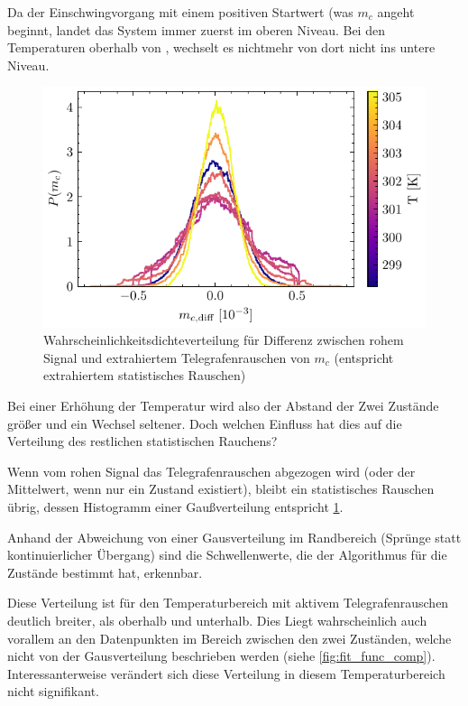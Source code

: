 \documentclass[main.tex]{subfiles}
\begin{document}
Da der Einschwingvorgang mit einem positiven Startwert (was \(m_c\) angeht beginnt, landet das System immer zuerst im oberen Niveau. Bei den Temperaturen oberhalb von , wechselt es nichtmehr von dort nicht ins untere Niveau. 

\begin{figure}[H]
    \centering
    \includegraphics{bilder/plots/temp_comparison_long/mc_diff_hist.pdf}
    \caption{Wahrscheinlichkeitsdichteverteilung für Differenz zwischen rohem Signal und extrahiertem Telegrafenrauschen von \(m_c\) (entspricht extrahiertem statistisches Rauschen)}\label{fig:temp-diff-hist}    
\end{figure}

Bei einer Erhöhung der Temperatur wird also der Abstand der Zwei Zustände größer und ein Wechsel seltener. Doch welchen Einfluss hat dies auf die Verteilung des restlichen statistischen Rauchens?

Wenn vom rohen Signal das Telegrafenrauschen abgezogen wird (oder der Mittelwert, wenn nur ein Zustand existiert), bleibt ein statistisches Rauschen übrig, dessen Histogramm einer Gaußverteilung entspricht \cref{fig:temp-diff-hist}. 

Anhand der Abweichung von einer Gausverteilung im Randbereich (Sprünge statt kontinuierlicher Übergang) sind die Schwellenwerte, die der Algorithmus für die Zustände bestimmt hat, erkennbar.

Diese Verteilung ist für den Temperaturbereich mit aktivem Telegrafenrauschen deutlich breiter, als oberhalb und unterhalb. Dies Liegt wahrscheinlich auch vorallem an den Datenpunkten im Bereich zwischen den zwei Zuständen, welche nicht von der Gausverteilung beschrieben werden (siehe \cref{fig:fit_func_comp}).
Interessanterweise verändert sich diese Verteilung in diesem Temperaturbereich nicht signifikant.
\end{document}
